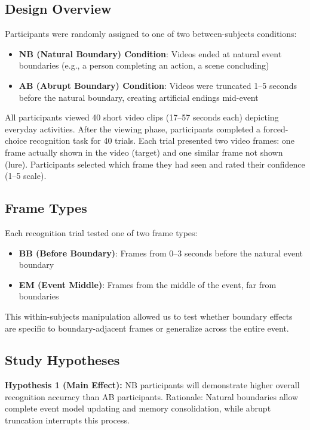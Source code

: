 \documentclass[11pt]{article}
\begin{document}
\subsection{Design Overview}
Participants were randomly assigned to one of two between-subjects conditions:
\begin{itemize}
  \item \textbf{NB (Natural Boundary) Condition}: Videos ended at natural event boundaries (e.g., a person completing an action, a scene concluding)
  \item \textbf{AB (Abrupt Boundary) Condition}: Videos were truncated 1--5 seconds before the natural boundary, creating artificial endings mid-event
\end{itemize}

All participants viewed 40 short video clips (17--57 seconds each) depicting everyday activities. After the viewing phase, participants completed a forced-choice recognition task for 40 trials. Each trial presented two video frames: one frame actually shown in the video (target) and one similar frame not shown (lure). Participants selected which frame they had seen and rated their confidence (1--5 scale).

\subsection{Frame Types}
Each recognition trial tested one of two frame types:
\begin{itemize}
  \item \textbf{BB (Before Boundary)}: Frames from 0--3 seconds before the natural event boundary
  \item \textbf{EM (Event Middle)}: Frames from the middle of the event, far from boundaries
\end{itemize}

This within-subjects manipulation allowed us to test whether boundary effects are specific to boundary-adjacent frames or generalize across the entire event.

\subsection{Study Hypotheses}
\textbf{Hypothesis 1 (Main Effect):} NB participants will demonstrate higher overall recognition accuracy than AB participants. Rationale: Natural boundaries allow complete event model updating and memory consolidation, while abrupt truncation interrupts this process.
\end{document}
